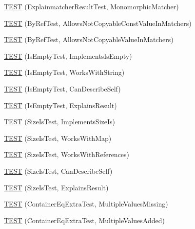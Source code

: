 \begin{DoxyCompactItemize}
\hyperlink{namespacetesting_1_1gmock__matchers__test_a102b10d9064f6e0037e3f3f0c3e76e22}{T\+E\+ST} (Explainmatcher\+Result\+Test, Monomorphic\+Matcher)
\item 
\hyperlink{namespacetesting_1_1gmock__matchers__test_aab82f120c70dc7d8bc2fd74ac6897486}{T\+E\+ST} (By\+Ref\+Test, Allows\+Not\+Copyable\+Const\+Value\+In\+Matchers)
\item 
\hyperlink{namespacetesting_1_1gmock__matchers__test_a5ed7b822889a34f018c2ba8f21941fd4}{T\+E\+ST} (By\+Ref\+Test, Allows\+Not\+Copyable\+Value\+In\+Matchers)
\item 
\hyperlink{namespacetesting_1_1gmock__matchers__test_ab63796f77c7572f6f1aef01cb140f99e}{T\+E\+ST} (Is\+Empty\+Test, Implements\+Is\+Empty)
\item 
\hyperlink{namespacetesting_1_1gmock__matchers__test_a22f0cacccee169b7390741b9815f4281}{T\+E\+ST} (Is\+Empty\+Test, Works\+With\+String)
\item 
\hyperlink{namespacetesting_1_1gmock__matchers__test_adcf3743190f973f2773296d0772e8950}{T\+E\+ST} (Is\+Empty\+Test, Can\+Describe\+Self)
\item 
\hyperlink{namespacetesting_1_1gmock__matchers__test_a1c168c284000d05d63bf5e9df10d1b7c}{T\+E\+ST} (Is\+Empty\+Test, Explains\+Result)
\item 
\hyperlink{namespacetesting_1_1gmock__matchers__test_abe619d5d1910e1f2e8b169622d1d8592}{T\+E\+ST} (Size\+Is\+Test, Implements\+Size\+Is)
\item 
\hyperlink{namespacetesting_1_1gmock__matchers__test_aea77169d6c56b88b5c99273d5a2bc0f2}{T\+E\+ST} (Size\+Is\+Test, Works\+With\+Map)
\item 
\hyperlink{namespacetesting_1_1gmock__matchers__test_a53bcd375786f69d889a8e8891ff8e0b0}{T\+E\+ST} (Size\+Is\+Test, Works\+With\+References)
\item 
\hyperlink{namespacetesting_1_1gmock__matchers__test_adc9720306de1626aa7e523637ca64dfa}{T\+E\+ST} (Size\+Is\+Test, Can\+Describe\+Self)
\item 
\hyperlink{namespacetesting_1_1gmock__matchers__test_a6c218845fd345302c490ef53f0d36995}{T\+E\+ST} (Size\+Is\+Test, Explains\+Result)
\item 
\hyperlink{namespacetesting_1_1gmock__matchers__test_ab84ac6cfde20f21ed69d5d7aa882ea1b}{T\+E\+ST} (Container\+Eq\+Extra\+Test, Multiple\+Values\+Missing)
\item 
\hyperlink{namespacetesting_1_1gmock__matchers__test_acc28beb0f3d3fbd8923bad7eb08ce6a6}{T\+E\+ST} (Container\+Eq\+Extra\+Test, Multiple\+Values\+Added)

\end{DoxyCompactItemize}
